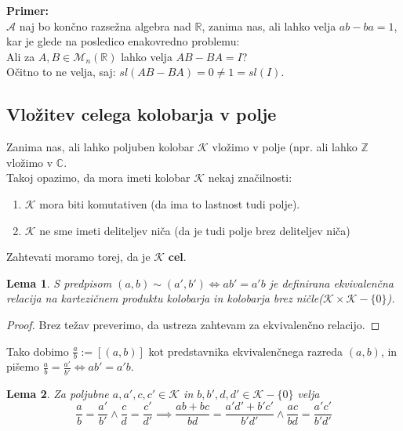 \documentclass[a4paper]{article}
\newcounter{environment:definition_counter}
\newcounter{environment:theorem_counter}
\newcounter{environment:statement_counter}
\newcounter{example:example_counter}
\newenvironment{example}
{\textbf{Primer:}\\}
{\setcounter{example:example_counter}{0}}
\newtheorem{lemma}{Lema}
\begin{document}
\begin{example}
$\mathcal{A}$ naj bo končno razsežna algebra nad $\mathbb{R}$, zanima nas, ali lahko velja $ab-ba = 1$, kar je glede na posledico enakovredno problemu:\\
Ali za $A,B \in \mathcal{M}_n(\mathbb{R})$ lahko velja $AB - BA = I$?\\
Očitno to ne velja, saj: $sl(AB-BA) = 0 \neq 1 = sl(I)$. 

\end{example}


\subsection{Vložitev celega kolobarja v polje}

Zanima nas, ali lahko poljuben kolobar $\mathcal{K}$ vložimo v polje (npr. ali lahko $\mathbb{Z}$ vložimo v $\mathbb{C}$.\\
Takoj opazimo, da mora imeti kolobar $\mathcal{K}$ nekaj značilnosti:
\begin{enumerate}
\item $\mathcal{K}$ mora biti komutativen (da ima to lastnost tudi polje).
\item $\mathcal{K}$ ne sme imeti deliteljev niča (da je tudi polje brez deliteljev niča)
\end{enumerate}

Zahtevati moramo torej, da je $\mathcal{K}$ \textbf{cel}.


\begin{lemma}
S predpisom $(a,b) \sim (a',b') \iff ab' = a'b$ je definirana ekvivalenčna relacija na kartezičnem produktu kolobarja in kolobarja brez ničle($\mathcal{K} \times \mathcal{K}-\{0\}$).
\end{lemma}

\begin{proof}
Brez težav preverimo, da ustreza zahtevam za ekvivalenčno relacijo.
\end{proof}

Tako dobimo $\frac{a}{b} := [(a,b)]$ kot predstavnika ekvivalenčnega razreda $(a,b)$, in pišemo $\frac{a}{b} = \frac{a'}{b'} \iff ab' = a'b$.

\begin{lemma}
Za poljubne $a,a', c, c' \in \mathcal{K}$ in $b,b', d, d' \in \mathcal{K} - \{0\}$ velja $$\frac{a}{b} = \frac{a'}{b'} \land \frac{c}{d} = \frac{c'}{d'} \implies \frac{ab+bc}{bd} = \frac{a'd' + b'c'}{b'd'}\land \frac{ac}{bd} = \frac{a'c'}{b'd'}$$
\end{lemma}
\end{document}
